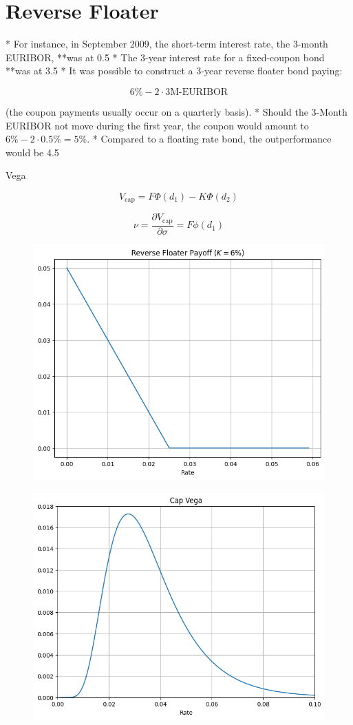\documentclass[12pt,a4paper]{article}
\begin{document}
\clearpage
\section{Reverse Floater}

* For instance, in September 2009, the short-term interest rate, the 3-month EURIBOR, **was at 0.5%
* The 3-year interest rate for a fixed-coupon bond **was at 3.5%
* It was possible to construct a 3-year reverse floater bond paying:

$$ 6\% - 2 \cdot \text{3M-EURIBOR}$$

(the coupon payments usually occur on a quarterly basis). 
* Should the 3-Month EURIBOR not move during the first year, the coupon would amount to $6\% - 2 \cdot 0.5\% = 5\%$. 
* Compared to a floating rate bond, the outperformance would be 4.5%

Vega 

$$V_{\text{cap}}=F\Phi(d_1) - K\Phi(d_2)$$

$$\nu = \frac{\partial V_{\text{cap}}}{\partial\sigma} =
F\phi(d_1)$$

\begin{figure}[htbp]
	\begin{center}
		\includegraphics[width=0.5\linewidth]{addons/reverse_floater_payoff}
	\end{center}
	\label{fig:reverse_floater_payoff}
\end{figure}

\begin{figure}[htbp]
	\begin{center}
		\includegraphics[width=0.5\linewidth]{addons/cap_vega}
	\end{center}
	\label{fig:cap_vega}
\end{figure}
\end{document}
